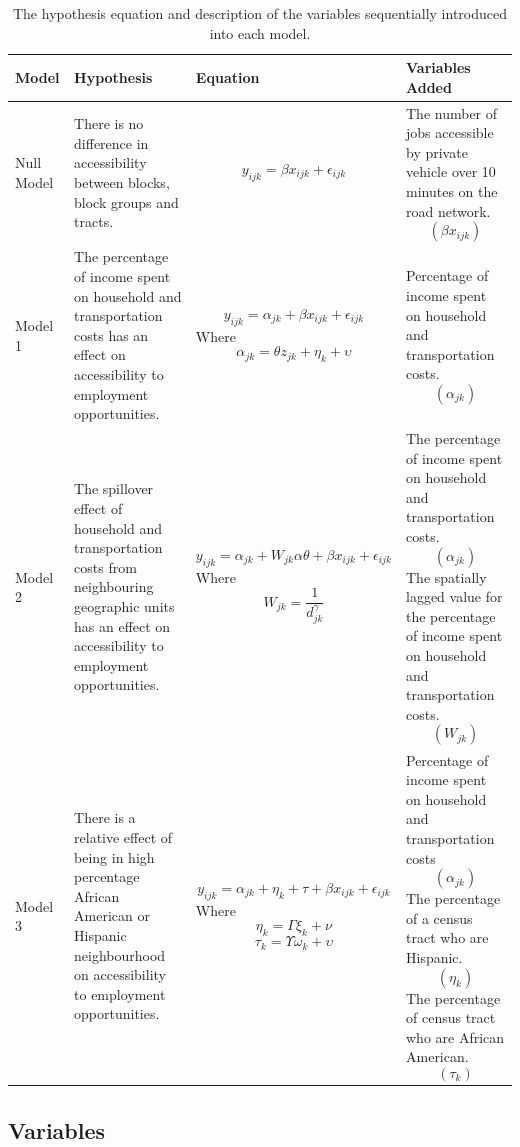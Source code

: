 \documentclass[a4paper,UKenglish]{lipics-v2018}
\begin{document}
\begin{table}[H]
 \singlespacing 
 \centering
 \small
 \begin{tabular}{p{1.6cm}p{3cm}p{5cm}p{3.5cm}} 
 \toprule
 Model & Hypothesis & Equation & Variables Added \\ [0.5ex] 
 \hline
 Null Model & 
 There is no difference in accessibility between blocks, block groups and tracts. & 
 \[y_{ijk} = \beta x_{ijk} + \epsilon_{ijk}\] & The number of jobs accessible by private vehicle over 10 minutes on the road network. \[(\beta x_{ijk})\] \\ 
 Model 1 & 
 The percentage of income spent on household and transportation costs has an effect on accessibility to employment opportunities. & 
 \[y_{ijk} = \alpha_{jk} + \beta x_{ijk} + \epsilon_{ijk}\] Where \[\alpha_{jk} = \theta z_{jk} + \eta_k + \upsilon\] & 
 Percentage of income spent on household and transportation costs. \[(\alpha_{jk})\] \\
 Model 2 & 
 The spillover effect of household and transportation costs from neighbouring  geographic units has an effect on accessibility to employment opportunities. & \[y_{ijk} = \alpha_{jk} + W_{jk}\alpha\theta + \beta x_{ijk} + \epsilon_{ijk}\] Where \[W_{jk} =  \frac{1}{d^\gamma_{jk}}\] & 
 The percentage of income spent on household and transportation costs.  \[(\alpha_{jk})\] 
 The spatially lagged value for the percentage of income spent on household and transportation costs. \[(W_{jk})\] \\
 Model 3 & 
 There is a relative effect of being in high percentage African American or Hispanic neighbourhood on accessibility to employment opportunities. & 
 \[y_{ijk} = \alpha_{jk} + \eta_k + \tau + \beta x_{ijk} + \epsilon_{ijk}\] Where \[\eta_k =  \Gamma\xi_k + \nu\] \[\tau_k =  \Upsilon\omega_k + \upsilon\] & 
 Percentage of income spent on household and transportation costs \[(\alpha_{jk})\]
 The percentage of a census tract who are Hispanic. \[(\eta_k)\]
 The percentage of census tract who are African American. \[(\tau_k)\] \\
 \bottomrule
 \end{tabular}
 \caption[Table 1]{The hypothesis equation and description of the variables sequentially introduced into each model.}
 \label{tab:table1} 
\end{table}

\subsection{Variables}
\end{document}
